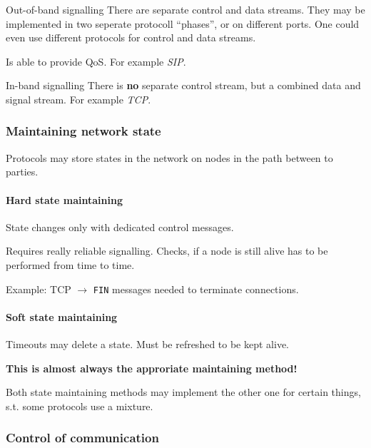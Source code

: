\documentclass[english]{panikzettel}
\newcommand{\alert}[1]{\textbf{\textcolor{red!75!black}{#1}}}
\begin{document}
	\begin{defi}{Out-of-band signalling}
		There are separate control and data streams.
		They may be implemented in two seperate protocoll \enquote{phases}, or on different ports.
		One could even use different protocols for control and data streams.

		Is able to provide QoS.
		\tcblower
		For example \textit{SIP}.
	\end{defi}

	\begin{defi}{In-band signalling}
		There is \textbf{no} separate control stream, but a combined data and signal stream.
		\tcblower
		For example \textit{TCP}.
	\end{defi}

	\subsubsection{Maintaining network state}
	\label{sss-maintaining-network-state}
	
	Protocols may store states in the network on nodes in the path between to parties.

	\paragraph{Hard state maintaining}
	\label{pgf-hard-state-maintaining}
	
	State changes only with dedicated control messages.

	Requires really reliable signalling.
	Checks, if a node is still alive has to be performed from time to time.

	Example: TCP \( \rightarrow \) \texttt{FIN} messages needed to terminate connections.

	\paragraph{Soft state maintaining}
	\label{pgf-soft-state-maintaining}
	
	Timeouts may delete a state. 
	Must be refreshed to be kept alive.

	\alert{This is almost always the approriate maintaining method!}

	Both state maintaining methods may implement the other one for certain things, s.t. some protocols use a mixture.

	\subsubsection{Control of communication}
	\label{sss-control-of-communication}
	
\end{document}
